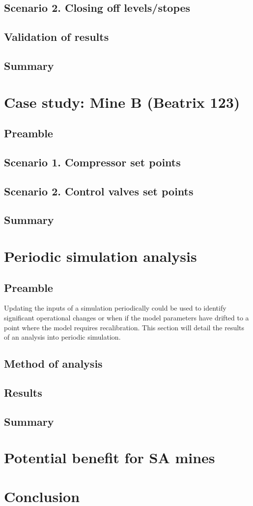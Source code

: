 	
	
	
	\subsection{Scenario 2. Closing off levels/stopes}
	
	\subsection{Validation of results}
	\subsection{Summary}
\section{Case study: Mine B \color{blue}(Beatrix 123)}
	\subsection{Preamble}
	\subsection{Scenario 1. Compressor set points}
	\subsection{Scenario 2. Control valves set points}
	\subsection{Summary}
\section{Periodic simulation analysis}
	\subsection{Preamble}
	 Updating the inputs of a simulation periodically could be used to identify significant operational changes or when if the model parameters have drifted to a point where the model requires recalibration. This section will detail the results of an analysis into periodic simulation.
	 \subsection{Method of analysis}
	 
	 \subsection{Results}
	\subsection{Summary}
\section{Potential benefit for SA mines}
\section{Conclusion}